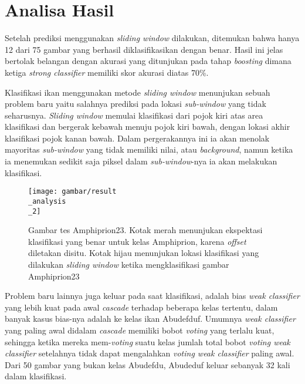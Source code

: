 \section{Analisa Hasil}
		Setelah prediksi menggunakan \textit{sliding window} dilakukan, ditemukan bahwa hanya 
		12 dari 75 gambar yang berhasil diklasifikasikan dengan benar. Hasil ini jelas bertolak 
		belangan dengan akurasi yang ditunjukan pada tahap \emph{boosting} dimana ketiga \emph{strong classifier} 
		memiliki skor akurasi diatas 70\%.

		Klasifikasi ikan menggunakan metode \emph{sliding window} menunjukan sebuah problem baru 
		yaitu salahnya prediksi pada lokasi \textit{sub-window} yang tidak seharusnya. \emph{Sliding window} 
		memulai klasifikasi dari pojok kiri atas area klasifikasi dan bergerak kebawah menuju pojok kiri bawah, dengan 
		lokasi akhir klasifikasi pojok kanan bawah. Dalam pergerakannya ini ia akan menolak mayoritas \textit{sub-window} 
		yang tidak memiliki nilai, atau \textit{background}, namun ketika ia menemukan sedikit saja piksel dalam 
		\textit{sub-window}-nya ia akan melakukan klasifikasi. 
		
		\begin{figure}[H]
			\centering{}
			  \texttt{[image: gambar/result\\\_analysis\\\_2]}
			\caption{Gambar tes Amphiprion23. Kotak merah menunjukan ekspektasi klasifikasi 
			yang benar untuk kelas Amphiprion, karena \textit{offset} diletakan disitu. Kotak 
			hijau menunjukan lokasi klasifikasi yang dilakukan \emph{sliding window} ketika mengklasifikasi 
			gambar Amphiprion23}
		\end{figure}
		
		Problem baru lainnya juga keluar pada saat klasifikasi, adalah 
		bias \emph{weak classifier} yang lebih kuat pada awal \emph{cascade} terhadap beberapa kelas tertentu, dalam 
		banyak kasus bias-nya adalah ke kelas ikan Abudefduf. Umumnya \emph{weak classifier} yang paling awal 
		didalam \emph{cascade} memiliki bobot \textit{voting} yang terlalu kuat, sehingga ketika mereka mem-\textit{voting} 
		suatu kelas jumlah total bobot \textit{voting weak classifier} setelahnya tidak dapat mengalahkan 
		\textit{voting weak classifier} paling awal. Dari 50 gambar yang bukan kelas Abudefdu, Abudeduf keluar sebanyak 
		32 kali dalam klasifikasi.
		
		

\begin{comment}

\end{comment}
